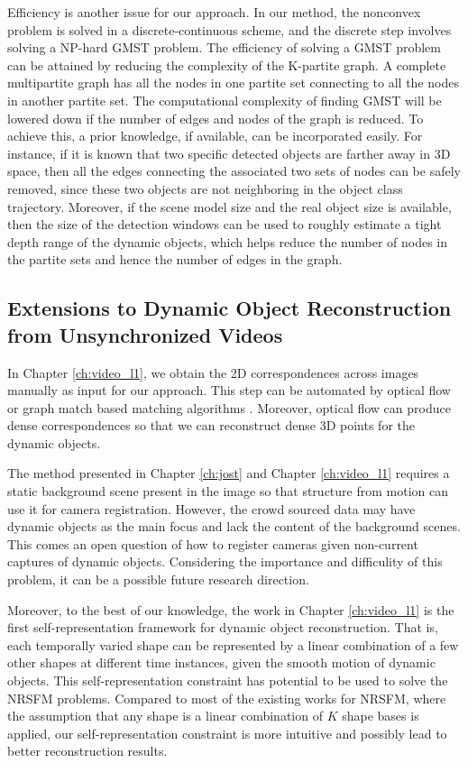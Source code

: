 Efficiency is another issue for our approach. In our method, the nonconvex problem is solved in a discrete-continuous scheme, and the discrete step involves solving a NP-hard GMST problem. The efficiency of solving a GMST problem can be attained by reducing the complexity of the K-partite graph. A complete multipartite graph has all the nodes in one partite set connecting to all the nodes in another partite set. The computational complexity of finding GMST will be lowered down if the number of edges and nodes of the graph is reduced. 
To achieve this, a prior knowledge, if available, can be incorporated easily. 
For instance, if it is known that two specific detected objects are farther away in 3D space, then all the edges connecting the associated two sets of nodes can be safely removed, since these two objects are not neighboring in the object class trajectory. Moreover, if the scene model size and the real object size is available, then the size of the detection windows can be used to roughly estimate a tight depth range of the dynamic objects, which helps reduce the number of nodes in the partite sets and hence the number of edges in the graph.

\subsection{Extensions to Dynamic Object Reconstruction from Unsynchronized Videos}

In Chapter \ref{ch:video_l1}, we obtain the 2D correspondences across images manually as input for our approach. 
This step can be automated by optical flow \cite{brox2004high} or graph match based matching algorithms \cite{yan2015multi,Yan_2015_CVPR}. Moreover, optical flow can produce dense correspondences so that we can reconstruct dense 3D points for the dynamic objects. 

The method presented in Chapter \ref{ch:jost} and Chapter \ref{ch:video_l1} requires a static background scene present in the image so that structure from motion can use it for camera registration. However, the crowd sourced data may have dynamic objects as the main focus and lack the content of the background scenes. This comes an open question of how to register cameras given non-current captures of dynamic objects. Considering the importance and difficulity of this problem, it can be a possible future research direction.

Moreover, to the best of our knowledge, the work in Chapter \ref{ch:video_l1} is the first self-representation framework for dynamic object reconstruction. That is, each temporally varied shape can be represented by a linear combination of a few other shapes at different time instances, given the smooth motion of dynamic objects. This self-representation constraint has potential to be used to solve the NRSFM problems. Compared to most of the existing works for NRSFM, where the assumption that any shape is a linear combination of $K$ shape bases is applied, our self-representation constraint is more intuitive and possibly lead to better reconstruction results.
